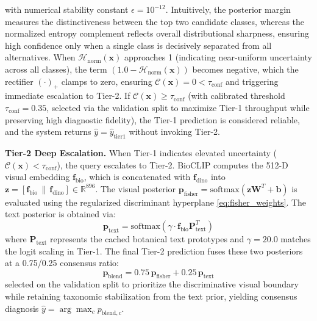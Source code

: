 \documentclass[conference]{IEEEtran}
\begin{document}
with numerical stability constant $\epsilon = 10^{-12}$. Intuitively, the posterior margin measures the distinctiveness between the top two candidate classes, whereas the normalized entropy complement reflects overall distributional sharpness, ensuring high confidence only when a single class is decisively separated from all alternatives. When $\mathcal{H}_{\text{norm}}(\mathbf{x})$ approaches 1 (indicating near-uniform uncertainty across all classes), the term $(1.0 - \mathcal{H}_{\text{norm}}(\mathbf{x}))$ becomes negative, which the rectifier $(\cdot)_+$ clamps to zero, ensuring $\mathcal{C}(\mathbf{x}) = 0 < \tau_{\text{conf}}$ and triggering immediate escalation to Tier-2. If $\mathcal{C}(\mathbf{x}) \ge \tau_{\text{conf}}$ (with calibrated threshold $\tau_{\text{conf}} = 0.35$, selected via the validation split to maximize Tier-1 throughput while preserving high diagnostic fidelity), the Tier-1 prediction is considered reliable, and the system returns $\hat{y} = \hat{y}_{\text{tier1}}$ without invoking Tier-2.

\textbf{Tier-2 Deep Escalation.} When Tier-1 indicates elevated uncertainty ($\mathcal{C}(\mathbf{x}) < \tau_{\text{conf}}$), the query escalates to Tier-2. BioCLIP computes the 512-D visual embedding $\mathbf{f}_{\text{bio}}$, which is concatenated with $\mathbf{f}_{\text{dino}}$ into $\mathbf{z} = [\mathbf{f}_{\text{bio}} \,\|\, \mathbf{f}_{\text{dino}}] \in \mathbb{R}^{896}$. The visual posterior $\mathbf{p}_{\text{fisher}} = \text{softmax}\left(\mathbf{z} \mathbf{W}^T + \mathbf{b}\right)$ is evaluated using the regularized discriminant hyperplane \eqref{eq:fisher_weights}. The text posterior is obtained via:
\begin{equation}
    \mathbf{p}_{\text{text}} = \text{softmax}\left(\gamma \cdot \mathbf{f}_{\text{bio}} \mathbf{P}_{\text{text}}^T\right)
\end{equation}
where $\mathbf{P}_{\text{text}}$ represents the cached botanical text prototypes and $\gamma = 20.0$ matches the logit scaling in Tier-1. The final Tier-2 prediction fuses these two posteriors at a 0.75/0.25 consensus ratio:
\begin{equation}
    \label{eq:multimodal_blend}
    \mathbf{p}_{\text{blend}} = 0.75 \, \mathbf{p}_{\text{fisher}} + 0.25 \, \mathbf{p}_{\text{text}}
\end{equation}
selected on the validation split to prioritize the discriminative visual boundary while retaining taxonomic stabilization from the text prior, yielding consensus diagnosis $\hat{y} = \arg\max_c p_{\text{blend}, c}$.
\end{document}
